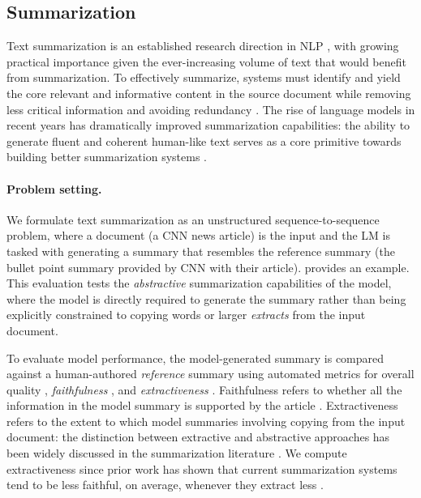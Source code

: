 \hypertarget{summarization}{\subsection{Summarization}}
\label{sec:summarization}
Text summarization is an established research direction in NLP \citep{luhn1958automatic, mani1999advances, sparck1999automatic, nenkova2012survey}, with growing practical importance given the ever-increasing volume of text that would benefit from summarization.
To effectively summarize, systems must identify and yield the core relevant and informative content in the source document while removing less critical information and avoiding redundancy \citep{peyrard2019simple}.
The rise of language models in recent years has dramatically improved summarization capabilities: the ability to generate fluent and coherent human-like text serves as a core primitive towards building better summarization systems \citep{lewis-etal-2020-bart, https://doi.org/10.48550/arxiv.1912.08777}.


\paragraph{Problem setting.} 
We formulate text summarization as an unstructured sequence-to-sequence problem, where a document (\eg a CNN news article) is the input and the LM is tasked with generating a summary that resembles the reference summary (\eg the bullet point summary provided by CNN with their article).
 provides an example.
This evaluation tests the \textit{abstractive} summarization capabilities of the model, where the model is directly required to generate the summary rather than being explicitly constrained to copying words or larger \textit{extracts} from the input document.

To evaluate model performance, the model-generated summary is compared against a human-authored \textit{reference} summary using automated metrics for overall quality \citep[\texttt{ROUGE-2}; BERTScore;][]{lin-2004-rouge, bert-score}, \textit{faithfulness} \citep{10.1162/tacl_a_00453,fabbri-etal-2022-qafacteval}, and \textit{extractiveness} \citep{grusky2018newsroom}. Faithfulness refers to whether all the information in the model summary is supported by the article \citep{cao2018faithful,durmus-etal-2020-feqa,maynez-etal-2020-faithfulness}. 
Extractiveness refers to the extent to which model summaries involving copying from the input document: the distinction between extractive and abstractive approaches has been widely discussed in the summarization literature \citep[see][]{nenkova2012survey}. 
We compute extractiveness since prior work has shown that current summarization systems tend to be less faithful, on average, whenever they extract less \citep{durmus-etal-2020-feqa,mrini2021rewards,ladhak-etal-2022-faithful}.

